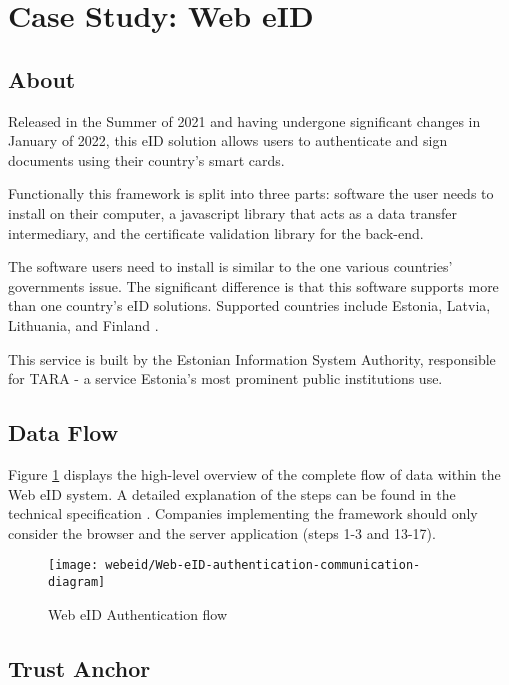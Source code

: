 \section{Case Study: Web eID}

\subsection{About}

Released in the Summer of 2021 \cite{ria-webeid} and having undergone significant changes in January of 2022, this eID solution allows users to authenticate and sign documents using their country's smart cards.

Functionally this framework is split into three parts: software the user needs to install on their computer, a javascript library that acts as a data transfer intermediary, and the certificate validation library for the back-end.

The software users need to install is similar to the one various countries' governments issue. The significant difference is that this software supports more than one country's eID solutions. Supported countries include Estonia, Latvia, Lithuania, and Finland \cite{ria-webeid}.

This service is built by the Estonian Information System Authority, responsible for TARA - a service Estonia's most prominent public institutions use.

\subsection{Data Flow}

Figure \ref{fig:web-eid-authentication} displays the high-level overview of the complete flow of data within the Web eID system. A detailed explanation of the steps can be found in the technical specification \cite{ria-webeid-systemarchitecture}. Companies implementing the framework should only consider the browser and the server application (steps 1-3 and 13-17).

\begin{figure}
  \centering
  \texttt{[image: webeid/Web-eID-authentication-communication-diagram]}
  \caption{Web eID Authentication flow \cite{ria-webeid-systemarchitecture}}
  \label{fig:web-eid-authentication}
\end{figure}

\subsection{Trust Anchor}

